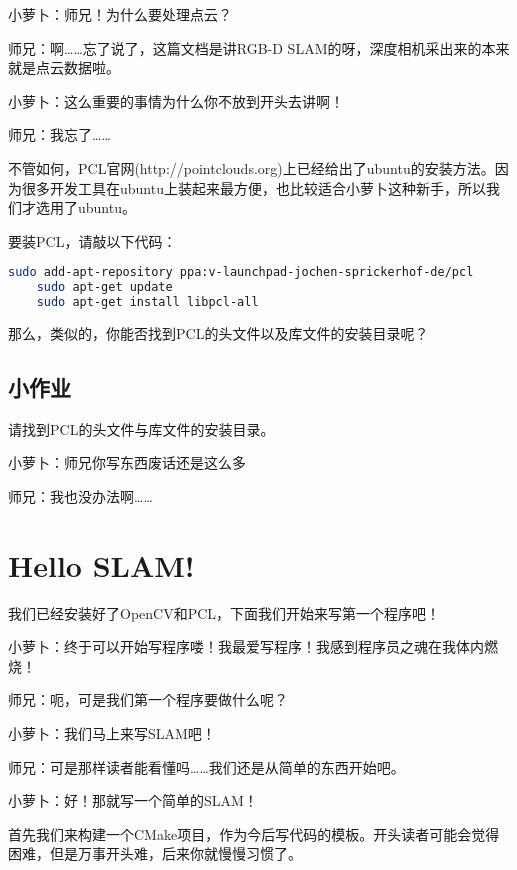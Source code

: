 \documentclass[9pt,a4paper]{article}
\begin{document}
\begin{itemize}
    小萝卜：师兄！为什么要处理点云？
    
    师兄：啊……忘了说了，这篇文档是讲RGB-D SLAM的呀，深度相机采出来的本来就是点云数据啦。
    
    小萝卜：这么重要的事情为什么你不放到开头去讲啊！
    
    师兄：我忘了……
    
    不管如何，PCL官网(http://pointclouds.org)上已经给出了ubuntu的安装方法。因为很多开发工具在ubuntu上装起来最方便，也比较适合小萝卜这种新手，所以我们才选用了ubuntu。
    
    要装PCL，请敲以下代码：
    \begin{lstlisting}[language=sh]
    sudo add-apt-repository ppa:v-launchpad-jochen-sprickerhof-de/pcl
    sudo apt-get update
    sudo apt-get install libpcl-all
    \end{lstlisting}
    
    那么，类似的，你能否找到PCL的头文件以及库文件的安装目录呢？
    \begin{framed}  
    \subsection*{小作业}
    请找到PCL的头文件与库文件的安装目录。
    \end{framed}
    
    
    
\end{itemize}

小萝卜：师兄你写东西废话还是这么多~

师兄：我也没办法啊……

\section{Hello SLAM!}
我们已经安装好了OpenCV和PCL，下面我们开始来写第一个程序吧！

小萝卜：终于可以开始写程序喽！我最爱写程序！我感到程序员之魂在我体内燃烧！

师兄：呃，可是我们第一个程序要做什么呢？

小萝卜：我们马上来写SLAM吧！

师兄：可是那样读者能看懂吗……我们还是从简单的东西开始吧。

小萝卜：好！那就写一个简单的SLAM！

首先我们来构建一个CMake项目，作为今后写代码的模板。开头读者可能会觉得困难，但是万事开头难，后来你就慢慢习惯了。
\end{document}
